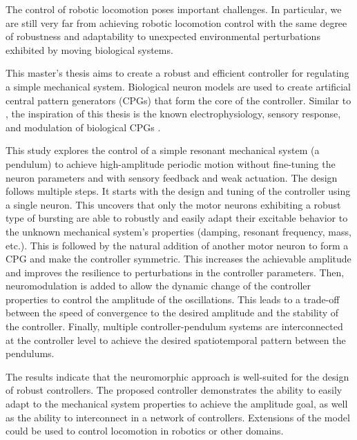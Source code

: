 The control of robotic locomotion poses important challenges. In particular, we are still very far from achieving robotic locomotion control with the same degree of robustness and adaptability to unexpected environmental perturbations exhibited by moving biological systems.

This master’s thesis aims to create a robust and efficient controller for regulating a simple mechanical system. Biological neuron models are used to create artificial central pattern generators (CPGs) that form the core of the controller. Similar to \citet{CPGRobot}, the inspiration of this thesis is the known electrophysiology, sensory response, and modulation of biological CPGs \citep{crayfish,stickInsect,MARDER}.

This study explores the control of a simple resonant mechanical system (a pendulum) to achieve high-amplitude periodic motion without fine-tuning the neuron parameters and with sensory feedback and weak actuation. The design follows multiple steps. It starts with the design and tuning of the controller using a single neuron. This uncovers that only the motor neurons exhibiting a robust type of bursting \citep{burstingSlowFeedback,Franci2} are able to robustly and easily adapt their excitable behavior to the unknown mechanical system's properties (damping, resonant frequency, mass, etc.).
This is followed by the natural addition of another motor neuron to form a CPG and make the controller symmetric. This increases the achievable amplitude and improves the resilience to perturbations in the controller parameters.
Then, neuromodulation is added to allow the dynamic change of the controller properties to control the amplitude of the oscillations. This leads to a trade-off between the speed of convergence to the desired amplitude and the stability of the controller.
Finally, multiple controller-pendulum systems are interconnected at the controller level to achieve the desired spatiotemporal pattern between the pendulums.

The results indicate that the neuromorphic approach is well-suited for the design of robust controllers. The proposed controller demonstrates the ability to easily adapt to the mechanical system properties to achieve the amplitude goal, as well as the ability to interconnect in a network of controllers. Extensions of the model could be used to control locomotion in robotics or other domains.
